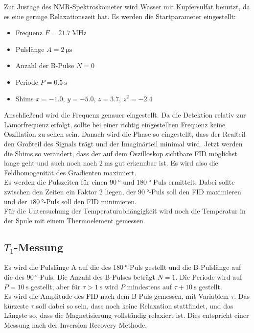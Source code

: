         \noindent Zur Justage des NMR-Spektroskometer wird Wasser mit Kupfersulfat benutzt, da es eine geringe Relaxationszeit hat. Es werden die Startparameter eingestellt: 
        \begin{itemize}
            \item Frequenz $F = \SI{21.7}{\mega\hertz}$
            \item Pulslänge $A = \SI{2}{\micro\second}$
            \item Anzahl der B-Pulse $N = \num{0}$ 
            \item Periode $P = \SI{0.5}{\second}$ 
            \item Shims $x = \num{-1.0}$, $y = \num{-5.0}$, $z = \num{3.7}$, $z^2 = \num{-2.4}$
        \end{itemize}
        Anschließend wird die Frequenz genauer eingestellt. Da die Detektion relativ zur Lamorfrequenz erfolgt, sollte bei einer richtig eingestellten Frequenz keine Oszillation zu sehen sein. 
        Danach wird die Phase so eingestellt, dass der Realteil den Großteil des Signals trägt und der Imaginärteil minimal wird. Jetzt werden die Shims so verändert, dass der auf dem Oszilloskop 
        sichtbare FID möglichst lange geht und auch noch nach $\SI{2}{\milli\second}$ gut erkennbar ist. Es wird also die Feldhomogenität des Gradienten maximiert. \\
        Es werden die Pulszeiten für einen $\SI{90}{\degree}$ und $\SI{180}{\degree}$ Puls ermittelt. Dabei sollte zwischen den Zeiten ein Faktor 2 liegen, der $\SI{90}{\degree}$-Puls soll den 
        FID maximieren und der $\SI{180}{\degree}$-Puls soll den FID minimieren. \\
        Für die Untersuchung der Temperaturabhängigkeit wird noch die Temperatur in der Spule mit einem Thermoelement gemessen. 
        
    \subsection{$T_1$-Messung}

        \noindent Es wird die Pulslänge A auf die des $\SI{180}{\degree}$-Puls gestellt und die B-Pulslänge auf die des $\SI{90}{\degree}$-Puls. Die Anzahl des B-Pulses beträgt $N = 1$. Die Periode 
        wird auf $ P = \SI{10}{\second}$ gestellt, aber für $\tau > \SI{1}{\second}$ wird $P$ mindestens auf $\tau + \SI{10}{\second}$ gestellt.\\ 
        Es wird die Amplitude des FID nach dem B-Puls gemessen, mit Variablem $\tau$. Das kürzeste $\tau$ soll dabei so sein, dass noch keine Relaxation stattfindet, und das Längste so, dass die Magnetisierung 
        vollständig relaxiert ist. Dies entspricht einer Messung nach der Inversion Recovery Methode.

